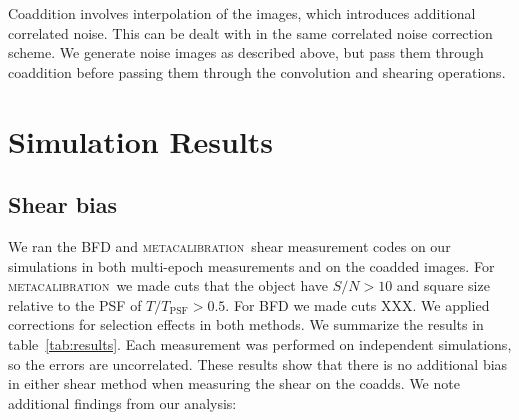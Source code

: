 \documentclass[fleqn,useAMS,usenatbib]{mnras}
\newcommand{\snr}{$S/N$}
\newcommand{\mcal}{\textsc{metacalibration}}
\begin{document}
Coaddition involves interpolation of the images, which introduces additional
correlated noise.  This can be dealt with in the same correlated noise
correction scheme.  We generate noise images as described above, but pass them
through coaddition before passing them through the convolution and shearing
operations.


\section{Simulation Results}
\label{Section:Results}

\subsection{Shear bias} We ran the BFD and \mcal\ shear measurement codes on
our simulations in both multi-epoch measurements and on the coadded images. For
\mcal\ we made cuts that the object have \snr$ > 10$ and square size relative
to the PSF of $T/T_{\mathrm{PSF}} > 0.5$.  For BFD we made cuts XXX.  We
applied corrections for selection effects in both methods.  We summarize the
results in table~\ref{tab:results}.  Each measurement was performed on
independent simulations, so the errors are uncorrelated.  These results show
that there is no additional bias in either shear method when measuring the
shear on the coadds.  We note additional findings from our
analysis: 
\end{document}
